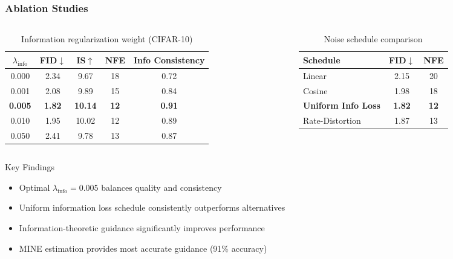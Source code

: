 \documentclass[aspectratio=169]{beamer}
\begin{document}
\begin{frame}
\frametitle{Ablation Studies}
\begin{columns}
\begin{column}{0.5\textwidth}
\begin{table}
\centering
\caption{Information regularization weight (CIFAR-10)}
\begin{tabular}{c|ccc|c}
\hline
$\lambda_{\text{info}}$ & FID$\downarrow$ & IS$\uparrow$ & NFE & Info Consistency \\
\hline
0.000 & 2.34 & 9.67 & 18 & 0.72 \\
0.001 & 2.08 & 9.89 & 15 & 0.84 \\
\textbf{0.005} & \textbf{1.82} & \textbf{10.14} & \textbf{12} & \textbf{0.91} \\
0.010 & 1.95 & 10.02 & 12 & 0.89 \\
0.050 & 2.41 & 9.78 & 13 & 0.87 \\
\hline
\end{tabular}
\end{table}
\end{column}
\begin{column}{0.5\textwidth}
\begin{table}
\centering
\caption{Noise schedule comparison}
\begin{tabular}{l|cc}
\hline
\textbf{Schedule} & FID$\downarrow$ & NFE \\
\hline
Linear & 2.15 & 20 \\
Cosine & 1.98 & 18 \\
\textbf{Uniform Info Loss} & \textbf{1.82} & \textbf{12} \\
Rate-Distortion & 1.87 & 13 \\
\hline
\end{tabular}
\end{table}
\end{column}
\end{columns}

\begin{block}{Key Findings}
\begin{itemize}
\item Optimal $\lambda_{\text{info}} = 0.005$ balances quality and consistency
\item Uniform information loss schedule consistently outperforms alternatives
\item Information-theoretic guidance significantly improves performance
\item MINE estimation provides most accurate guidance (91\% accuracy)
\end{itemize}
\end{block}
\end{frame}
\end{document}

